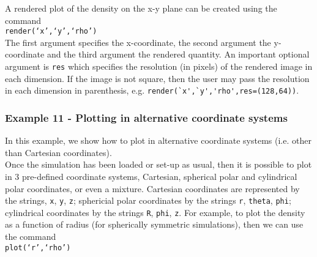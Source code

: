 \documentclass[a4paper]{article}
\newcommand{\var}[1]{\texttt{#1}}
\newcommand{\singlecommand}[1]{\\ \newline \indent \var{#1} \\ \newline \noindent}
\begin{document}




\noindent A rendered plot of the density on the x-y plane can be created using the command \singlecommand{render(`x',`y',`rho')}  The first argument specifies the x-coordinate, the second argument the y-coordinate and the third argument the rendered quantity.  An important optional argument is \var{res} which specifies the resolution (in pixels) of the rendered image in each dimension.  If the image is not square, then the user may pass the resolution in each dimension in parenthesis, e.g. \lstinline{render(`x',`y','rho',res=(128,64))}.


\subsubsection{Example  11 - Plotting in alternative coordinate systems}
In this example, we show how to plot in alternative coordinate systems (i.e. other than Cartesian coordinates). \\







\noindent Once the simulation has been loaded or set-up as usual, then it is possible to plot in 3 pre-defined coordinate systems, Cartesian, spherical polar and cylindrical polar coordinates, or even a mixture.  Cartesian coordinates are represented by the strings, \var{x}, \var{y}, \var{z}; sphericial polar coordinates by the strings \var{r}, \var{theta}, \var{phi}; cylindrical coordinates by the strings \var{R}, \var{phi}, \var{z}.  For example, to plot the density as a function of radius (for spherically symmetric simulations), then we can use the command \singlecommand{plot(`r',`rho')}



\end{document}

